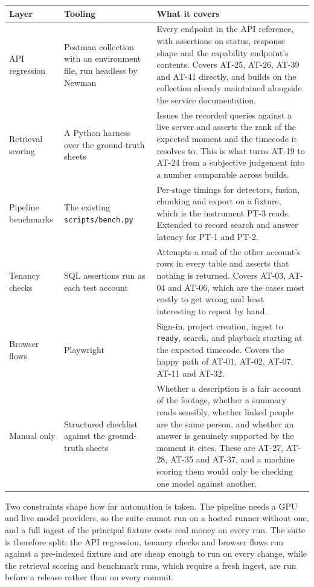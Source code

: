 \begin{table}[htbp]
\centering
\small
\begin{tabularx}{\textwidth}{@{}L{2.9cm}L{3.0cm}X@{}}
\toprule
\textbf{Layer} & \textbf{Tooling} & \textbf{What it covers} \\
\midrule
API regression &
Postman collection with an environment file, run headless by Newman &
Every endpoint in the API reference, with assertions on status, response shape and the
capability endpoint's contents. Covers AT-25, AT-26, AT-39 and AT-41 directly, and
builds on the collection already maintained alongside the service documentation. \\
Retrieval scoring &
A Python harness over the ground-truth sheets &
Issues the recorded queries against a live server and asserts the rank of the expected
moment and the timecode it resolves to. This is what turns AT-19 to AT-24 from a
subjective judgement into a number comparable across builds. \\
Pipeline benchmarks &
The existing \texttt{scripts/bench.py} &
Per-stage timings for detectors, fusion, chunking and export on a fixture, which is the
instrument PT-3 reads. Extended to record search and answer latency for PT-1 and PT-2. \\
Tenancy checks &
SQL assertions run as each test account &
Attempts a read of the other account's rows in every table and asserts that nothing is
returned. Covers AT-03, AT-04 and AT-06, which are the cases most costly to get wrong
and least interesting to repeat by hand. \\
Browser flows &
Playwright &
Sign-in, project creation, ingest to \texttt{ready}, search, and playback starting at the
expected timecode. Covers the happy path of AT-01, AT-02, AT-07, AT-11 and AT-32. \\
\midrule
Manual only &
Structured checklist against the ground-truth sheets &
Whether a description is a fair account of the footage, whether a summary reads
sensibly, whether linked people are the same person, and whether an answer is genuinely
supported by the moment it cites. These are AT-27, AT-28, AT-35 and AT-37, and a machine
scoring them would only be checking one model against another. \\
\bottomrule
\end{tabularx}
\end{table}

Two constraints shape how far automation is taken. The pipeline needs a GPU and live
model providers, so the suite cannot run on a hosted runner without one, and a full
ingest of the principal fixture costs real money on every run. The suite is therefore
split: the API regression, tenancy checks and browser flows run against a pre-indexed
fixture and are cheap enough to run on every change, while the retrieval scoring and
benchmark runs, which require a fresh ingest, are run before a release rather than on
every commit.


